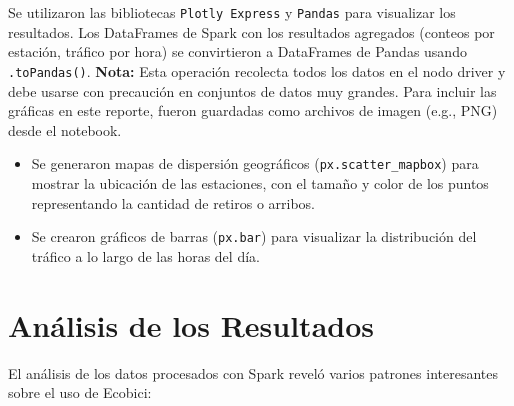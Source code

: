 \documentclass[12pt]{article}
\begin{document}
    Se utilizaron las bibliotecas \texttt{Plotly Express} y \texttt{Pandas} para visualizar los resultados. Los DataFrames de Spark con los resultados agregados (conteos por estación, tráfico por hora) se convirtieron a DataFrames de Pandas usando \texttt{.toPandas()}. \textbf{Nota:} Esta operación recolecta todos los datos en el nodo driver y debe usarse con precaución en conjuntos de datos muy grandes. Para incluir las gráficas en este reporte, fueron guardadas como archivos de imagen (e.g., PNG) desde el notebook.
    \begin{itemize}
        \item Se generaron mapas de dispersión geográficos (\texttt{px.scatter\_mapbox}) para mostrar la ubicación de las estaciones, con el tamaño y color de los puntos representando la cantidad de retiros o arribos.
        \item Se crearon gráficos de barras (\texttt{px.bar}) para visualizar la distribución del tráfico a lo largo de las horas del día.
    \end{itemize}

\section{Análisis de los Resultados}
    El análisis de los datos procesados con Spark reveló varios patrones interesantes sobre el uso de Ecobici:
\end{document}
